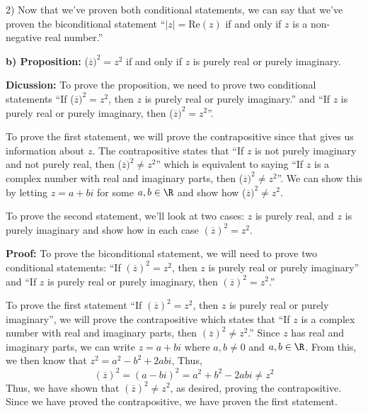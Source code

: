 \begin{paragraph}{2)}
        Now that we've proven both conditional statements, we can say that we've
        proven the biconditional statement ``$|z| = \text{Re}(z)$ if and 
        only if $z$ is a non-negative real number.''\\
        \proofEnd
        \bigskip

        \textbf{b) Proposition:} ($\overline{z})^2 = z^2$ if and only if $z$ is purely real or purely imaginary.
        \spacing

        \textbf{Dicussion:} To prove the proposition, we need to prove two conditional statements
        ``If ($\overline{z})^2 = z^2$, then $z$ is purely real or purely imaginary.'' and 
        ``If $z$ is purely real or purely imaginary, then ($\overline{z})^2 = z^2$''.
        \spacing

        To prove the first statement, we will prove the contrapositive since that gives us 
        information about $z$. The contrapositive states that ``If $z$ is not purely imaginary and
        not purely real, then ($\overline{z})^2 \neq z^2$'' which is equivalent to saying 
        ``If $z$ is a complex number with real and imaginary parts, then ($\overline{z})^2 \neq z^2$''.
        We can show this by letting $z = a + bi$ for some $a, b \in \R$ and show how 
        ($\overline{z})^2 \neq z^2$.
        \spacing

        To prove the second statement, we'll look at two cases: $z$ is purely real, and $z$ is purely imaginary
        and show how in each case $(\overline{z})^2 = z^2$.
        \spacing

        \textbf{Proof:} To prove the biconditional statement, we will need to prove
        two conditional statements: ``If $(\overline{z})^2 = z^2$, then $z$ is 
        purely real or purely imaginary'' and ``If $z$ is purely real or purely imaginary,
        then $(\overline{z})^2 = z^2$.''
        \spacing

        To prove the first statement ``If $(\overline{z})^2 = z^2$, then $z$ is 
        purely real or purely imaginary'', we will prove the contrapositive which states
        that ``If $z$ is a complex number with real and imaginary parts, then 
        $(\overline{z})^2 \neq z^2$.'' Since $z$ has real and imaginary parts, we can write
        $z = a + bi$ where $a, b \neq 0$ and $a, b \in \R$. From this, we then know that
        $z^2 = a^2 - b^2 + 2abi$, Thus,
        $$(\overline{z})^2 = (a - bi)^2 = a^2 + b^2 - 2abi \neq z^2$$
        Thus, we have shown that $(\overline{z})^2 \neq z^2$, as desired, proving the 
        contrapositive. Since we have proved the contrapositive, we have proven the 
        first statement. 
        \spacing        
        

\end{paragraph}
